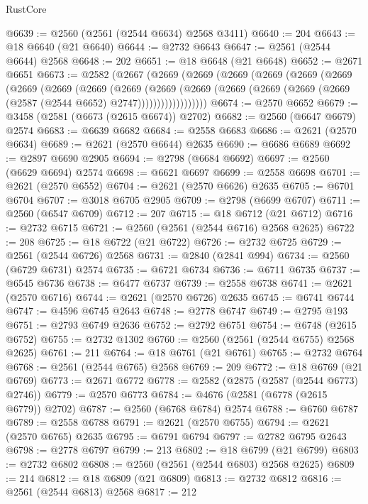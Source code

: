 \begin{lexlean}{RustCore}
\begin{coremodule}
@6639 := @2560 (@2561 (@2544 @6634) @2568 @3411)
@6640 := 204
@6643 := @18 @6640 (@21 @6640)
@6644 := @2732 @6643
@6647 := @2561 (@2544 @6644) @2568
@6648 := 202
@6651 := @18 @6648 (@21 @6648)
@6652 := @2671 @6651
@6673 := @2582
    (@2667
      (@2669
        (@2669
          (@2669
            (@2669
              (@2669
                (@2669
                  (@2669
                    (@2669
                      (@2669
                        (@2669
                          (@2669
                            (@2669
                              (@2669
                                (@2669 (@2669 (@2669 (@2587 (@2544 @6652) @2747))))))))))))))))))
@6674 := @2570 @6652
@6679 := @3458 (@2581 (@6673 (@2615 @6674)) @2702)
@6682 := @2560 (@6647 @6679) @2574
@6683 := @6639 @6682
@6684 := @2558 @6683
@6686 := @2621 (@2570 @6634)
@6689 := @2621 (@2570 @6644) @2635
@6690 := @6686 @6689
@6692 := @2897 @6690 @2905
@6694 := @2798 (@6684 @6692)
@6697 := @2560 (@6629 @6694) @2574
@6698 := @6621 @6697
@6699 := @2558 @6698
@6701 := @2621 (@2570 @6552)
@6704 := @2621 (@2570 @6626) @2635
@6705 := @6701 @6704
@6707 := @3018 @6705 @2905
@6709 := @2798 (@6699 @6707)
@6711 := @2560 (@6547 @6709)
@6712 := 207
@6715 := @18 @6712 (@21 @6712)
@6716 := @2732 @6715
@6721 := @2560 (@2561 (@2544 @6716) @2568 @2625)
@6722 := 208
@6725 := @18 @6722 (@21 @6722)
@6726 := @2732 @6725
@6729 := @2561 (@2544 @6726) @2568
@6731 := @2840 (@2841 @994)
@6734 := @2560 (@6729 @6731) @2574
@6735 := @6721 @6734
@6736 := @6711 @6735
@6737 := @6545 @6736
@6738 := @6477 @6737
@6739 := @2558 @6738
@6741 := @2621 (@2570 @6716)
@6744 := @2621 (@2570 @6726) @2635
@6745 := @6741 @6744
@6747 := @4596 @6745 @2643
@6748 := @2778 @6747
@6749 := @2795 @193
@6751 := @2793 @6749 @2636
@6752 := @2792 @6751
@6754 := @6748 (@2615 @6752)
@6755 := @2732 @1302
@6760 := @2560 (@2561 (@2544 @6755) @2568 @2625)
@6761 := 211
@6764 := @18 @6761 (@21 @6761)
@6765 := @2732 @6764
@6768 := @2561 (@2544 @6765) @2568
@6769 := 209
@6772 := @18 @6769 (@21 @6769)
@6773 := @2671 @6772
@6778 := @2582 (@2875 (@2587 (@2544 @6773) @2746))
@6779 := @2570 @6773
@6784 := @4676 (@2581 (@6778 (@2615 @6779)) @2702)
@6787 := @2560 (@6768 @6784) @2574
@6788 := @6760 @6787
@6789 := @2558 @6788
@6791 := @2621 (@2570 @6755)
@6794 := @2621 (@2570 @6765) @2635
@6795 := @6791 @6794
@6797 := @2782 @6795 @2643
@6798 := @2778 @6797
@6799 := 213
@6802 := @18 @6799 (@21 @6799)
@6803 := @2732 @6802
@6808 := @2560 (@2561 (@2544 @6803) @2568 @2625)
@6809 := 214
@6812 := @18 @6809 (@21 @6809)
@6813 := @2732 @6812
@6816 := @2561 (@2544 @6813) @2568
@6817 := 212

\end{coremodule}
\end{lexlean}
